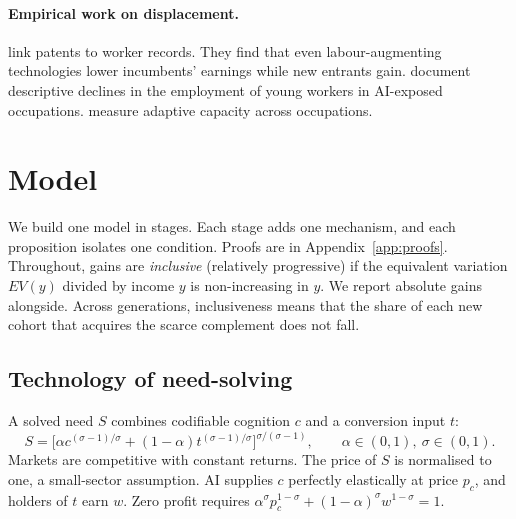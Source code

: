 \documentclass[12pt]{article}
\theoremstyle{remark}
\begin{document}
\paragraph{Empirical work on displacement.} \citet{kogan2023displacement} link patents to worker records. They find that even labour-augmenting technologies lower incumbents' earnings while new entrants gain. \citet{brynjolfsson2025canaries} document descriptive declines in the employment of young workers in AI-exposed occupations. \citet{manning2026adaptable} measure adaptive capacity across occupations.

\section{Model}\label{sec:model}

We build one model in stages. Each stage adds one mechanism, and each proposition isolates one condition. Proofs are in Appendix~\ref{app:proofs}. Throughout, gains are \emph{inclusive} (relatively progressive) if the equivalent variation $EV(y)$ divided by income $y$ is non-increasing in $y$. We report absolute gains alongside. Across generations, inclusiveness means that the share of each new cohort that acquires the scarce complement does not fall.

\subsection{Technology of need-solving}\label{sec:tech}

A solved need $S$ combines codifiable cognition $c$ and a conversion input $t$:
\begin{equation}
S=\big[\alpha c^{(\sigma-1)/\sigma}+(1-\alpha)t^{(\sigma-1)/\sigma}\big]^{\sigma/(\sigma-1)},\qquad \alpha\in(0,1),\ \sigma\in(0,1).
\end{equation}
Markets are competitive with constant returns. The price of $S$ is normalised to one, a small-sector assumption. AI supplies $c$ perfectly elastically at price $p_c$, and holders of $t$ earn $w$. Zero profit requires $\alpha^\sigma p_c^{1-\sigma}+(1-\alpha)^\sigma w^{1-\sigma}=1$.
\end{document}

